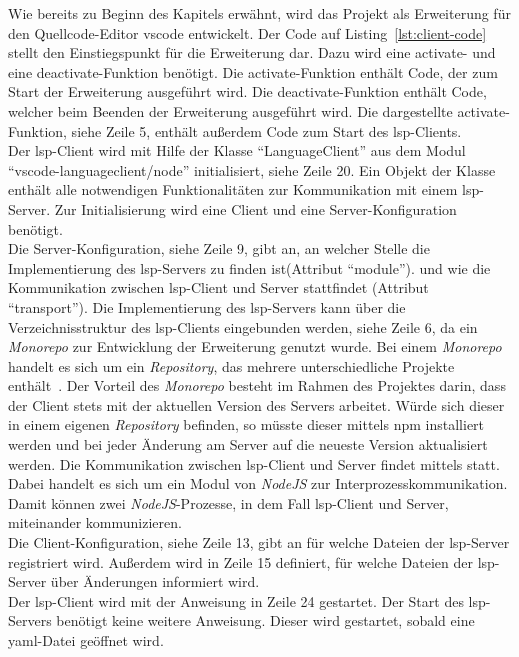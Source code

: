 Wie bereits zu Beginn des Kapitels erwähnt, wird das Projekt als Erweiterung für den Quellcode-Editor \ac{vscode} entwickelt.
Der Code auf Listing~\ref{lst:client-code} stellt den Einstiegspunkt für die Erweiterung dar.
Dazu wird eine activate- und eine deactivate-Funktion benötigt. Die activate-Funktion enthält Code, der zum Start der Erweiterung ausgeführt wird.
Die deactivate-Funktion enthält Code, welcher beim Beenden der Erweiterung ausgeführt wird.
Die dargestellte activate-Funktion, siehe Zeile 5, enthält außerdem Code zum Start des \ac{lsp}-Clients.
\\
Der \ac{lsp}-Client wird mit Hilfe der Klasse ``LanguageClient'' aus dem Modul ``vscode-languageclient/node'' initialisiert, siehe Zeile 20.
Ein Objekt der Klasse enthält alle notwendigen Funktionalitäten zur Kommunikation mit einem \ac{lsp}-Server.
Zur Initialisierung wird eine Client und eine Server-Konfiguration benötigt.
\\
Die Server-Konfiguration, siehe Zeile 9, gibt an, an welcher Stelle die Implementierung des \ac{lsp}-Servers zu finden ist(Attribut ``module'').
und wie die Kommunikation zwischen \ac{lsp}-Client und Server stattfindet (Attribut ``transport'').
Die Implementierung des \ac{lsp}-Servers kann über die Verzeichnisstruktur des \ac{lsp}-Clients eingebunden werden, siehe Zeile 6, da
ein \textit{Monorepo} zur Entwicklung der Erweiterung genutzt wurde.
Bei einem \textit{Monorepo} handelt es sich um ein \textit{Repository}, das mehrere unterschiedliche Projekte enthält~\cite{monorepo-narwhal}.
Der Vorteil des \textit{Monorepo} besteht im Rahmen des Projektes darin, dass der Client stets mit der aktuellen Version des Servers arbeitet.
Würde sich dieser in einem eigenen \textit{Repository} befinden, so müsste dieser mittels \ac{npm} installiert werden und bei jeder Änderung am Server auf
die neueste Version aktualisiert werden.
Die Kommunikation zwischen \ac{lsp}-Client und Server findet mittels  statt. Dabei handelt es sich um ein Modul von \textit{NodeJS}
zur Interprozesskommunikation. Damit können zwei \textit{NodeJS}-Prozesse, in dem Fall \acs{lsp}-Client und Server, miteinander kommunizieren.
\\
Die Client-Konfiguration, siehe Zeile 13, gibt an für welche Dateien der \ac{lsp}-Server registriert wird. Außerdem wird in Zeile 15 definiert,
für welche Dateien der \ac{lsp}-Server über Änderungen informiert wird.
\\
Der \ac{lsp}-Client wird mit der Anweisung in Zeile 24 gestartet. Der Start des \ac{lsp}-Servers benötigt keine weitere Anweisung.
Dieser wird gestartet, sobald eine \ac{yaml}-Datei geöffnet wird.

